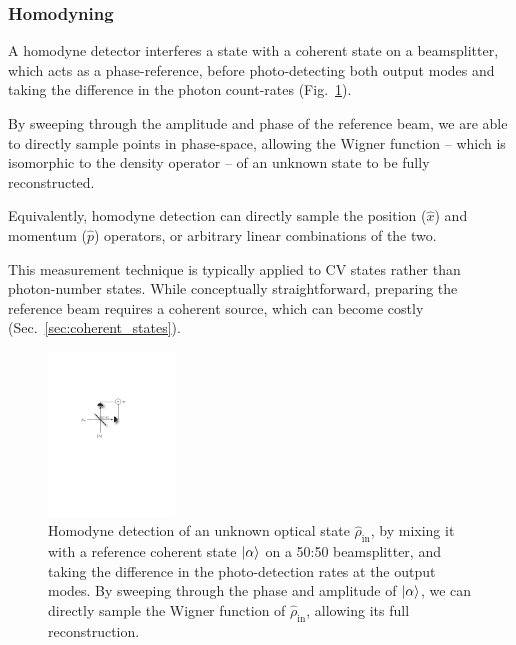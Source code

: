 %
%

\subsubsection{Homodyning} \label{sec:homodyne} 

A homodyne detector interferes a state with a coherent state on a beamsplitter, which acts as a phase-reference, before photo-detecting both output modes and taking the difference in the photon count-rates (Fig.~\ref{fig:homodyne}).

By sweeping through the amplitude and phase of the reference beam, we are able to directly sample points in phase-space, allowing the Wigner function -- which is isomorphic to the density operator -- of an unknown state to be fully reconstructed.

Equivalently, homodyne detection can directly sample the position ($\hat x$) and momentum ($\hat p$) operators, or arbitrary linear combinations of the two. 

This measurement technique is typically applied to CV states rather than photon-number states. While conceptually straightforward, preparing the reference beam requires a coherent source, which can become costly (Sec.~\ref{sec:coherent_states}).

\begin{figure}[!htb]
\includegraphics[width=0.3\textwidth]{homodyne}
\caption{Homodyne detection of an unknown optical state $\hat\rho_\text{in}$, by mixing it with a reference coherent state $|\alpha\rangle$ on a 50:50 beamsplitter, and taking the difference in the photo-detection rates at the output modes. By sweeping through the phase and amplitude of $|\alpha\rangle$, we can directly sample the Wigner function of $\hat\rho_\text{in}$, allowing its full reconstruction.} \label{fig:homodyne}
\end{figure}

%
%

